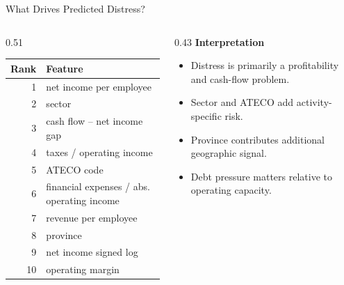 \documentclass[aspectratio=169,10pt]{beamer}
\begin{document}
\begin{frame}{What Drives Predicted Distress?}
  \begin{columns}[T,totalwidth=\textwidth]
    \begin{column}{0.51\textwidth}
      \small
      \begin{tabular}{rl}
        \toprule
        Rank & Feature \\
        \midrule
        1 & net income per employee \\
        2 & sector \\
        3 & cash flow -- net income gap \\
        4 & taxes / operating income \\
        5 & ATECO code \\
        6 & financial expenses / abs. operating income \\
        7 & revenue per employee \\
        8 & province \\
        9 & net income signed log \\
        10 & operating margin \\
        \bottomrule
      \end{tabular}
    \end{column}

    \begin{column}{0.43\textwidth}
      \textbf{Interpretation}
      \begin{itemize}
        \item Distress is primarily a profitability and cash-flow problem.
        \item Sector and ATECO add activity-specific risk.
        \item Province contributes additional geographic signal.
        \item Debt pressure matters relative to operating capacity.
      \end{itemize}
    \end{column}
  \end{columns}
\end{frame}
\end{document}
